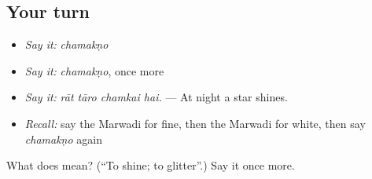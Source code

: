 \subsection*{Your turn}
\begin{itemize}
\raggedright
  \item \emph{Say it:} \emph{chamakṇo}
  \item \emph{Say it:} \emph{chamakṇo}, once more
  \item \emph{Say it:} \emph{rāt tāro chamkai hai.} — At night a star shines.
  \item \emph{Recall:} say the Marwadi for fine, then the Marwadi for white, then say \emph{chamakṇo} again
\end{itemize}

\begin{tcolorbox}[breakable,colback=teal!4,colframe=teal!35!black,title={Before you move on}]
What does  mean? (\textquotedblleft{}To shine; to glitter\textquotedblright{}.) Say it once more.
\end{tcolorbox}
